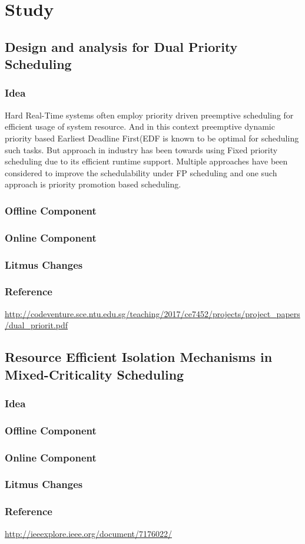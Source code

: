 \section{Study}
\subsection{Design and analysis for Dual Priority Scheduling}
\subsubsection{Idea}
Hard Real-Time systems often employ priority driven preemptive scheduling for efficient usage of system resource. And in this context preemptive dynamic priority based Earliest Deadline First(EDF is known to be optimal for scheduling such tasks.
But approach in industry has been towards using Fixed priority scheduling due to its efficient runtime support. Multiple approaches have been considered to improve the schedulability under FP scheduling and one such approach is priority promotion based scheduling.  
\subsubsection{Offline Component}
\subsubsection{Online Component}
\subsubsection{Litmus Changes}
\subsubsection{Reference}
\url{http://codeventure.sce.ntu.edu.sg/teaching/2017/ce7452/projects/project_papers/dual_priorit.pdf}

\subsection{Resource Efficient Isolation Mechanisms in Mixed-Criticality Scheduling}
\subsubsection{Idea}
\subsubsection{Offline Component}
\subsubsection{Online Component}
\subsubsection{Litmus Changes}
\subsubsection{Reference}
\url{http://ieeexplore.ieee.org/document/7176022/}